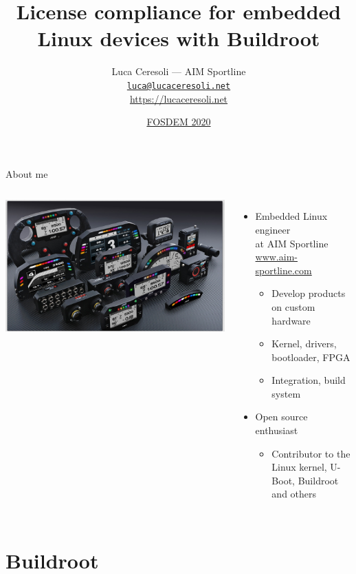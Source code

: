 \documentclass[xetex,table]{beamer}
\title{License compliance for embedded Linux devices with Buildroot}
\author{Luca Ceresoli --- AIM Sportline\\
  \href{mailto:luca@lucaceresoli.net}{\tt luca@lucaceresoli.net}\\
  \url{https://lucaceresoli.net}
}
\date{\href{https://fosdem.org/2020/schedule/event/buildroot_license_compliance/}{FOSDEM 2020}}
\begin{document}
\maketitle

\begin{frame}{About me}
  \begin{columns}
    \includegraphics[width=\textwidth]{../common/images/aim-products.jpg}

    \begin{itemize}
    \item Embedded Linux engineer\\
      at AIM Sportline\\
      {\footnotesize\href{https://www.aim-sportline.com/}{www.aim-sportline.com}}
      \begin{itemize}
      \item Develop products on custom hardware
      \item Kernel, drivers, bootloader, FPGA
      \item Integration, build system
      \end{itemize}
    \item Open source enthusiast
      \begin{itemize}
      \item Contributor to the Linux kernel, U-Boot, Buildroot and others
      \end{itemize}
    \end{itemize}
  \end{columns}
\end{frame}


\section{Buildroot}
\end{document}
